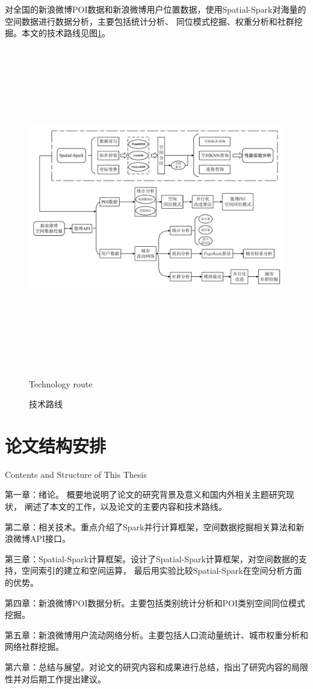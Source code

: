 对全国的新浪微博POI数据和新浪微博用户位置数据，使用Spatial-Spark对海量的空间数据进行数据分析，主要包括统计分析、
同位模式挖掘、权重分析和社群挖掘。本文的技术路线见图\ref{fig:thetechroute}。
\begin{figure}
\centering
\includegraphics[height=14cm]{figures/technology_route.pdf} \\
\caption{技术路线}{Technology route}
\label{fig:thetechroute}
\end{figure}

\section{论文结构安排}{Contents and Structure of This Thesis}

第一章：绪论。 概要地说明了论文的研究背景及意义和国内外相关主题研究现状，
阐述了本文的工作，以及论文的主要内容和技术路线。

第二章：相关技术。重点介绍了Spark并行计算框架，空间数据挖掘相关算法和新浪微博API接口。

第三章：Spatial-Spark计算框架。设计了Spatial-Spark计算框架，对空间数据的支持，空间索引的建立和空间运算，
最后用实验比较Spatial-Spark在空间分析方面的优势。

第四章：新浪微博POI数据分析。主要包括类别统计分析和POI类别空间同位模式挖掘。

第五章：新浪微博用户流动网络分析。主要包括人口流动量统计、城市权重分析和网络社群挖掘。

第六章：总结与展望。对论文的研究内容和成果进行总结，指出了研究内容的局限性并对后期工作提出建议。
